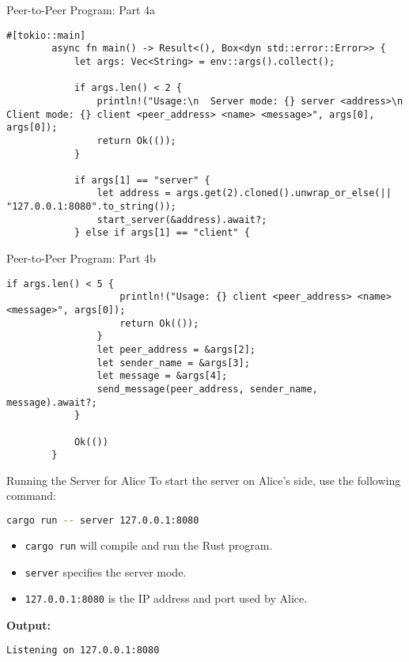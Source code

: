 \documentclass[aspectratio=169, table]{beamer}
\begin{document}
\begin{frame}[fragile]{Peer-to-Peer Program: Part 4a}
	\vspace{10pt}
	\begin{lstlisting}[style=RustStyle]
		#[tokio::main]
		async fn main() -> Result<(), Box<dyn std::error::Error>> {
			let args: Vec<String> = env::args().collect();
			
			if args.len() < 2 {
				println!("Usage:\n  Server mode: {} server <address>\n  Client mode: {} client <peer_address> <name> <message>", args[0], args[0]);
				return Ok(());
			}
			
			if args[1] == "server" {
				let address = args.get(2).cloned().unwrap_or_else(|| "127.0.0.1:8080".to_string());
				start_server(&address).await?;
			} else if args[1] == "client" {
			\end{lstlisting}
		\end{frame}
		
		\begin{frame}[fragile]{Peer-to-Peer Program: Part 4b}
			\vspace{10pt}
			\begin{lstlisting}[style=RustStyle]
				if args.len() < 5 {
					println!("Usage: {} client <peer_address> <name> <message>", args[0]);
					return Ok(());
				}
				let peer_address = &args[2];
				let sender_name = &args[3];
				let message = &args[4];
				send_message(peer_address, sender_name, message).await?;
			}
			
			Ok(())
		}
	\end{lstlisting}
\end{frame}

\begin{frame}[fragile]{Running the Server for Alice}
	\vspace{10pt}
	To start the server on Alice's side, use the following command:
	\begin{lstlisting}[language=bash]
		cargo run -- server 127.0.0.1:8080
	\end{lstlisting}
	
	\begin{itemize}
		\item \texttt{cargo run} will compile and run the Rust program.
		\item \texttt{server} specifies the server mode.
		\item \texttt{127.0.0.1:8080} is the IP address and port used by Alice.
	\end{itemize}
	
	\textbf{Output:}
	\begin{lstlisting}[language=bash]
		Listening on 127.0.0.1:8080
	\end{lstlisting}
\end{frame}
\end{document}
